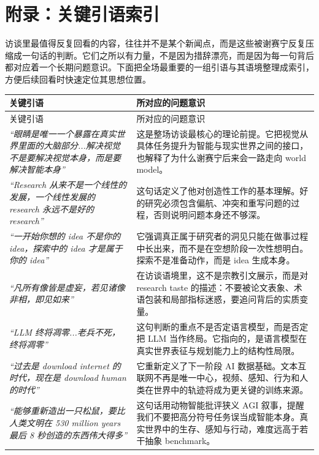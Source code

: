 \section*{附录：关键引语索引}

访谈里最值得反复回看的内容，往往并不是某个新闻点，而是这些被谢赛宁反复压缩成一句话的判断。它们之所以有力量，不是因为措辞漂亮，而是因为每一句背后都对应着一个长期问题意识。下面把全场最重要的一组引语与其语境整理成索引，方便后续回看时快速定位其思想位置。

\begin{longtable}{>{\raggedright\arraybackslash}p{} >{\raggedright\arraybackslash}p{}}
\toprule
关键引语 & 所对应的问题意识 \\
\midrule
\endfirsthead
\toprule
关键引语 & 所对应的问题意识 \\
\midrule
\endhead
\textit{``眼睛是唯一一个暴露在真实世界里面的大脑部分...解决视觉不是要解决视觉本身，而是要解决智能本身''} & 这是整场访谈最核心的理论前提。它把视觉从具体任务提升为智能与现实世界之间的接口，也解释了为什么谢赛宁后来会一路走向 world model。 \\
\textit{``Research 从来不是一个线性的发展，一个线性发展的 research 永远不是好的 research''} & 这句话定义了他对创造性工作的基本理解。好的研究必须包含偏航、冲突和重写问题的过程，否则说明问题本身还不够深。 \\
\textit{``一开始你想的 idea 不是你的 idea，探索中的 idea 才是属于你的 idea''} & 它强调真正属于研究者的洞见只能在做事过程中长出来，而不是在空想阶段一次性想明白。探索不是准备动作，而是 idea 生成本身。 \\
\textit{``凡所有像皆是虚妄，若见诸像非相，即见如来''} & 在访谈语境里，这不是宗教引文展示，而是对 research taste 的描述：不要被论文表象、术语包装和局部指标迷惑，要追问背后的实质变量。 \\
\textit{``LLM 终将凋零...老兵不死，终将凋零''} & 这句判断的重点不是否定语言模型，而是否定把 LLM 当作终局。它指向的，是语言模型在真实世界表征与规划能力上的结构性局限。 \\
\textit{``过去是 download internet 的时代，现在是 download human 的时代''} & 它重新定义了下一阶段 AI 数据基础。文本互联网不再是唯一中心，视频、感知、行为和人类在世界中的轨迹将成为更关键的训练来源。 \\
\textit{``能够重新造出一只松鼠，要比人类文明在 530 million years 最后 8 秒创造的东西伟大得多''} & 这句话用动物智能批评狭义 AGI 叙事，提醒我们不要把高分符号任务误当成智能本身。真实世界中的生存、感知与行动，难度远高于若干抽象 benchmark。 \\

\end{longtable}
